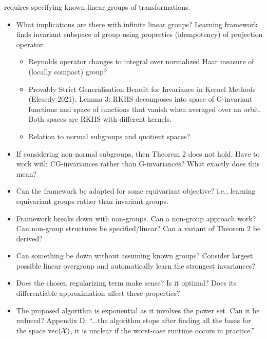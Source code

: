 \parencite{Mouli:2021} requires specifying known linear groups of transformations.
\begin{itemize}

\item
What implications are there with infinite linear groups? Learning framework finds invariant subspace of group using properties (idempotency) of projection operator.
\begin{itemize}
\item
Reynolds operator changes to integral over normalized Haar measure of (locally compact) group? 
\item
Provably Strict Generalisation Benefit for Invariance in Kernel Methods (Elesedy 2021). Lemma 3: RKHS decomposes into space of G-invariant functions and space of functions that vanish when averaged over an orbit. Both spaces are RKHS with different kernels.
\item
Relation to normal subgroups and quotient spaces?
\end{itemize}

\item
If considering non-normal subgroups, then Theorem 2 does not hold. Have to work with CG-invariances rather than G-invariances? What exactly does this mean?

\item
Can the framework be adapted for some equivariant objective? i.e., learning equivariant groups rather than invariant groups.

\item
Framework breaks down with non-groups. Can a non-group approach work? Can non-group structures be specified/linear? Can a variant of Theorem 2 be derived?

\item
Can something be down without assuming known groups? Consider largest possible linear overgroup and automatically learn the strongest invariances?

\item
Does the chosen regularizing term make sense? Is it optimal? Does its differentiable approximation affect these properties?

\item
The proposed algorithm is exponential as it involves the power set. Can it be reduced? Appendix D: ``...the algorithm stops after finding all the basis for the space vec$(\mathcal{X})$, it is unclear if the worst-case runtime occurs in practice.''

\end{itemize}